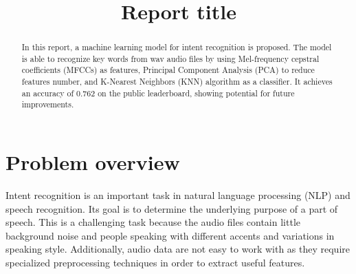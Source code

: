 \documentclass[conference]{IEEEtran}
\begin{document}
\title{Report title}

\author{
}

\maketitle

\begin{abstract}
    In this report, a machine learning model for intent recognition is proposed.
    The model is able to recognize key words from wav audio files by using Mel-frequency cepstral coefficients (MFCCs) as features, Principal Component Analysis (PCA) to reduce features number, and K-Nearest Neighbors (KNN) algorithm as a classifier.
    It achieves an accuracy of 0.762 on the public leaderboard, showing potential for future improvements.
\end{abstract}


%         
%         

\section{Problem overview}
Intent recognition is an important task in natural language processing (NLP) and speech recognition.
Its goal is to determine the underlying purpose of a part of speech.
This is a challenging task because the audio files contain little background noise and people speaking with different accents and variations in speaking style.
Additionally, audio data are not easy to work with as they require specialized preprocessing techniques in order to extract useful features.
\end{document}
